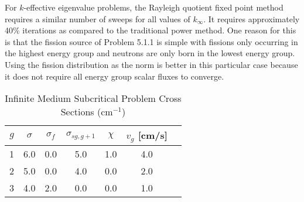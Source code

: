 For $k$-effective eigenvalue problems, the Rayleigh quotient fixed point method requires a similar number of sweeps for all values of $k_{\infty}$. It requires approximately 40\% iterations as compared to the traditional power method. One reason for this is that the fission source of Problem 5.1.1 is simple with fissions only occurring in the highest energy group and neutrons are only born in the lowest energy group. Using the fission distribution as the norm is better in this particular case because it does not require all energy group scalar fluxes to converge.

\begin{table}[]
    \centering
    \caption{Infinite Medium Subcritical Problem Cross Sections (cm$^{-1}$)}
\label{table:Betzler3}
    \begin{tabular}{*7c}
        \toprule
	$g$ & $\sigma$ & $\sigma_{f}$ & $\sigma_{sg,g+1}$ & $\chi$ & $v_{g}$ [cm/s] \\ 
        \midrule
	1 & 6.0 & 0.0 & 5.0 & 1.0 & 4.0 \\
	2 & 5.0 & 0.0 & 4.0 & 0.0 & 2.0 \\
	3 & 4.0 & 2.0 & 0.0 & 0.0 & 1.0 \\
        \bottomrule
    \end{tabular}
\end{table}

\begin{table}[H]
    \centering
    \caption{Reference Eigenvalues/Transport Sweeps for Convergence for Problem 5.1.1}
\label{table:InfMedNu}
\end{table}


